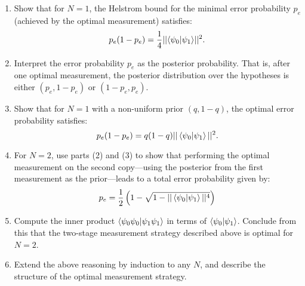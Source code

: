 \begin{enumerate}
    \item Show that for $N = 1$, the Helstrom bound for the minimal error probability $p_e$ (achieved by the optimal measurement) satisfies:
    \[
    p_e(1 - p_e) = \frac{1}{4}||{\braket{\psi_0|\psi_1}}||^2.
    \] 
    
    \item Interpret the error probability $p_e$ as the posterior probability. That is, after one optimal measurement, the posterior distribution over the hypotheses is either $(p_e, 1 - p_e)$ or $(1 - p_e, p_e)$.

    \item Show that for $N = 1$ with a non-uniform prior $(q, 1 - q)$, the optimal error probability satisfies:
    \[
    p_e(1 - p_e) = q(1 - q)||\braket{\psi_0|\psi_1}||^2.
    \]
    

    \item For $N = 2$, use parts (2) and (3) to show that performing the optimal measurement on the second copy—using the posterior from the first measurement as the prior—leads to a total error probability given by:
    \[
    p_e = \frac{1}{2}\left( 1 - \sqrt{1 - ||\braket{\psi_0|\psi_1}||^4} \right)
    \]

    \item Compute the inner product $\braket{\psi_0\psi_0 |\psi_1 \psi_1}$ in terms of $\braket{\psi_0|\psi_1}$. Conclude from this that the two-stage measurement strategy described above is optimal for $N = 2$.

    \item Extend the above reasoning by induction to any $N$, and describe the structure of the optimal measurement strategy.
\end{enumerate}
\printbibliography 



